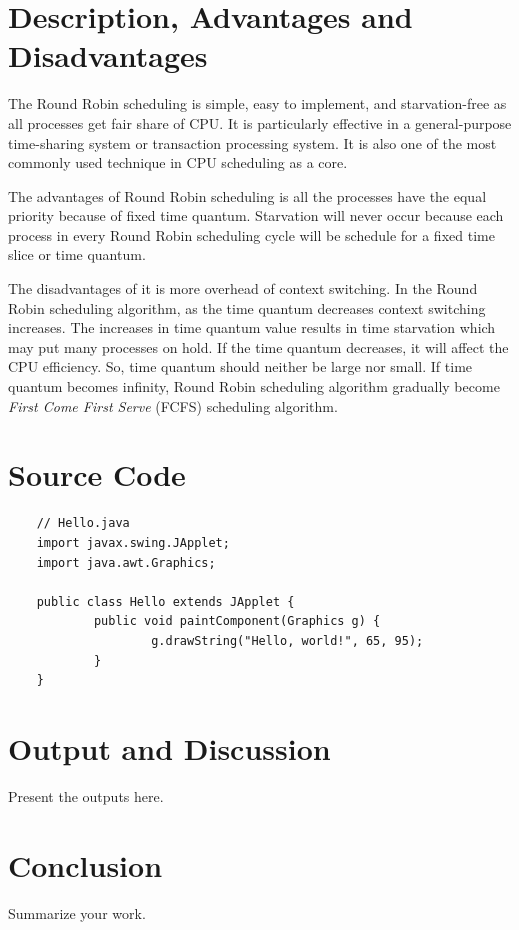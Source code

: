 \documentclass[12pt]{article}
\begin{document}
 \newpage 
 \section{Description, Advantages and Disadvantages}

The Round Robin scheduling is simple, easy to implement, and starvation-free as
all processes get fair share of CPU. It is particularly effective in a
general-purpose time-sharing system or transaction processing system. It is also
one of the most commonly used technique in CPU scheduling as a core.

The advantages of Round Robin scheduling is all the processes have the equal
priority because of fixed time quantum. Starvation will never occur because each
process in every Round Robin scheduling cycle will be schedule for a fixed time
slice or time quantum.

The disadvantages of it is more overhead of context switching. In the Round
Robin scheduling algorithm, as the time quantum decreases context switching
increases. The increases in time quantum value results in time starvation which
may put many processes on hold. If the time quantum decreases, it will affect
the CPU efficiency. So, time quantum should neither be large nor small. If time
quantum becomes infinity, Round Robin scheduling algorithm gradually become
\textit{First Come First Serve} (FCFS) scheduling algorithm.

\newpage
\section{Source Code}

\begin{lstlisting}
	// Hello.java
	import javax.swing.JApplet;
	import java.awt.Graphics;
	
	public class Hello extends JApplet {
			public void paintComponent(Graphics g) {
					g.drawString("Hello, world!", 65, 95);
			}    
	}
	\end{lstlisting}

\newpage
\section{Output and Discussion}
Present the outputs here.

\newpage
\section{Conclusion}
Summarize your work.


\newpage


\end{document}
